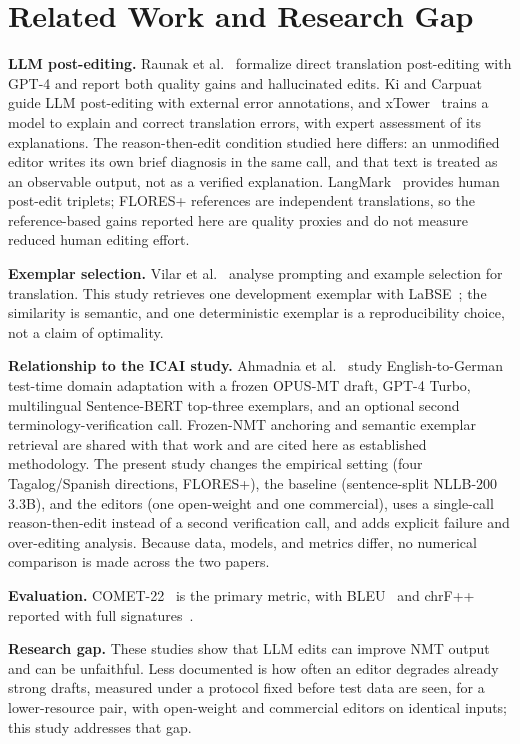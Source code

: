 \section{Related Work and Research Gap}
\textbf{LLM post-editing.} Raunak et al.~\cite{raunak2023} formalize direct translation post-editing with GPT-4 and report both quality gains and hallucinated edits. Ki and Carpuat~\cite{ki2024} guide LLM post-editing with external error annotations, and xTower~\cite{treviso2024} trains a model to explain and correct translation errors, with expert assessment of its explanations. The reason-then-edit condition studied here differs: an unmodified editor writes its own brief diagnosis in the same call, and that text is treated as an observable output, not as a verified explanation. LangMark~\cite{velazquez2025} provides human post-edit triplets; FLORES+ references are independent translations, so the reference-based gains reported here are quality proxies and do not measure reduced human editing effort.

\textbf{Exemplar selection.} Vilar et al.~\cite{vilar2023} analyse prompting and example selection for translation. This study retrieves one development exemplar with LaBSE~\cite{feng2022}; the similarity is semantic, and one deterministic exemplar is a reproducibility choice, not a claim of optimality.

\textbf{Relationship to the ICAI study.} Ahmadnia et al.~\cite{ahmadnia2026icai} study English-to-German test-time domain adaptation with a frozen OPUS-MT draft, GPT-4 Turbo, multilingual Sentence-BERT top-three exemplars, and an optional second terminology-verification call. Frozen-NMT anchoring and semantic exemplar retrieval are shared with that work and are cited here as established methodology. The present study changes the empirical setting (four Tagalog/Spanish directions, FLORES+), the baseline (sentence-split NLLB-200 3.3B), and the editors (one open-weight and one commercial), uses a single-call reason-then-edit instead of a second verification call, and adds explicit failure and over-editing analysis. Because data, models, and metrics differ, no numerical comparison is made across the two papers.

\textbf{Evaluation.} COMET-22~\cite{rei2020,rei2022} is the primary metric, with BLEU~\cite{papineni2002} and chrF++~\cite{popovic2015,popovic2017} reported with full signatures~\cite{post2018}.

\textbf{Research gap.} These studies show that LLM edits can improve NMT output and can be unfaithful. Less documented is how often an editor degrades already strong drafts, measured under a protocol fixed before test data are seen, for a lower-resource pair, with open-weight and commercial editors on identical inputs; this study addresses that gap.
